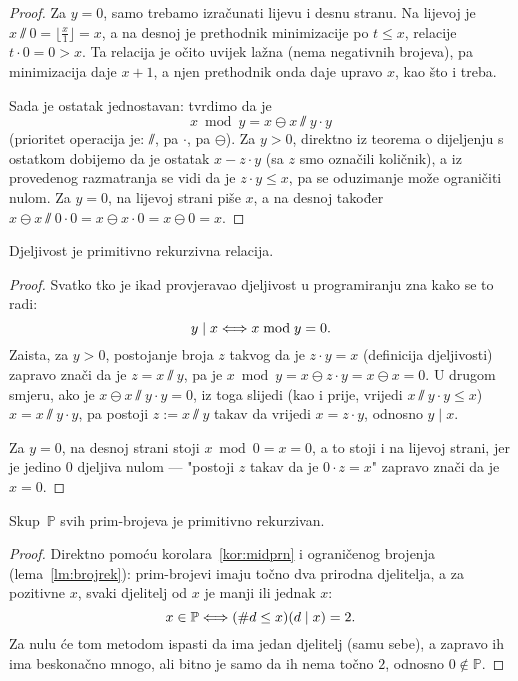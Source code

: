 \begin{proof}
Za $y=0$, samo trebamo izračunati lijevu i desnu stranu. Na lijevoj je $x\sslash 0=\bigl\lfloor\frac{x}{1}\bigr\rfloor=x$, a na desnoj je prethodnik minimizacije po $t\le x$, relacije $t\cdot 0=0>x$. Ta relacija je očito uvijek lažna (nema negativnih brojeva), pa minimizacija daje $x+1$, a njen prethodnik onda daje upravo $x$, kao što i treba.

Sada je ostatak jednostavan: tvrdimo da je
\begin{equation}
    x\bmod y=x\ominus x\sslash y\cdot y
\end{equation}
(prioritet operacija je: $\sslash$, pa $\cdot$, pa $\ominus$). Za $y>0$, direktno iz teorema o dijeljenju s ostatkom dobijemo da je ostatak $x-z\cdot y$ (sa $z$ smo označili količnik), a iz provedenog razmatranja se vidi da je $z\cdot y\le x$, pa se oduzimanje može ograničiti nulom. Za $y=0$, na lijevoj strani piše $x$, a na desnoj također $x\ominus x\sslash0\cdot 0=x\ominus x\cdot0=x\ominus0=x$.
\end{proof}

\begin{korolar}\label{kor:midprn}
Djeljivost je primitivno rekurzivna relacija.
\end{korolar}
\begin{proof}
Svatko tko je ikad provjeravao djeljivost u programiranju zna kako se to radi:
\begin{equation}
    y\mid x\Longleftrightarrow x\bmod y=0\text.
\end{equation}
Zaista, za $y>0$, postojanje broja $z$ takvog da je $z\cdot y=x$ (definicija djeljivosti) zapravo znači da je $z=x\sslash y$, pa je $x\bmod y=x\ominus z\cdot y=x\ominus x=0$. U drugom smjeru, ako je $x\ominus x\sslash y\cdot y=0$, iz toga slijedi (kao i prije, vrijedi $x\sslash y\cdot y\le x$) $x=x\sslash y\cdot y$, pa postoji $z:=x\sslash y$ takav da vrijedi $x=z\cdot y$, odnosno $y\mid x$.

Za $y=0$, na desnoj strani stoji $x\bmod 0=x=0$, a to stoji i na lijevoj strani, jer je jedino $0$ djeljiva nulom --- "postoji $z$ takav da je $0\cdot z=x$" zapravo znači da je $x=0$.
\end{proof}

\begin{korolar}
    Skup\, $\mathbb P$ svih prim-brojeva je primitivno rekurzivan.
\end{korolar}
\begin{proof}
Direktno pomoću korolara~\ref{kor:midprn} i ograničenog brojenja (lema~\ref{lm:brojrek}): prim-brojevi imaju točno dva prirodna djelitelja, a za pozitivne $x$, svaki djelitelj od $x$ je manji ili jednak $x$:
\begin{equation}\label{eq:Pprn}
    x\in\mathbb P\Longleftrightarrow(\#d\le x)(d\mid x)=2\text.
\end{equation}
Za nulu će tom metodom ispasti da ima jedan djelitelj (samu sebe), a zapravo ih ima beskonačno mnogo, ali bitno je samo da ih nema točno $2$, odnosno $0\not\in\mathbb P$.
\end{proof}

